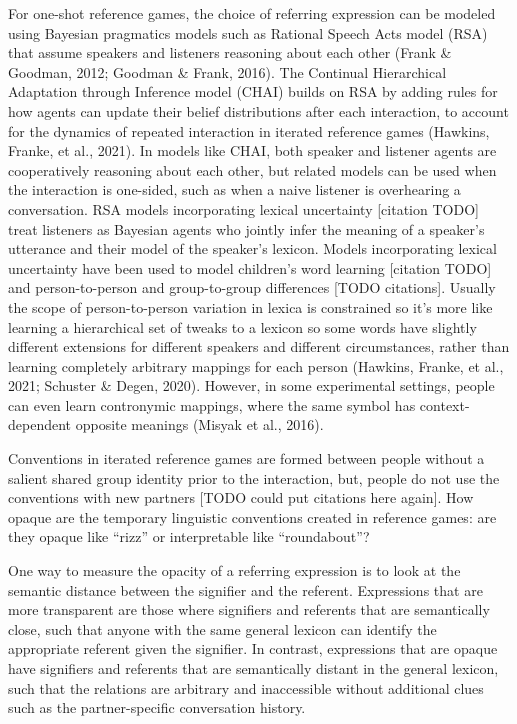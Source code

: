 \documentclass[10pt, letterpaper]{article}
\begin{document}
For one-shot reference games, the choice of referring expression can be
modeled using Bayesian pragmatics models such as Rational Speech Acts
model (RSA) that assume speakers and listeners reasoning about each
other (Frank \& Goodman, 2012; Goodman \& Frank, 2016). The Continual
Hierarchical Adaptation through Inference model (CHAI) builds on RSA by
adding rules for how agents can update their belief distributions after
each interaction, to account for the dynamics of repeated interaction in
iterated reference games (Hawkins, Franke, et al., 2021). In models like
CHAI, both speaker and listener agents are cooperatively reasoning about
each other, but related models can be used when the interaction is
one-sided, such as when a naive listener is overhearing a conversation.
RSA models incorporating lexical uncertainty {[}citation TODO{]} treat
listeners as Bayesian agents who jointly infer the meaning of a
speaker's utterance and their model of the speaker's lexicon. Models
incorporating lexical uncertainty have been used to model children's
word learning {[}citation TODO{]} and person-to-person and
group-to-group differences {[}TODO citations{]}. Usually the scope of
person-to-person variation in lexica is constrained so it's more like
learning a hierarchical set of tweaks to a lexicon so some words have
slightly different extensions for different speakers and different
circumstances, rather than learning completely arbitrary mappings for
each person (Hawkins, Franke, et al., 2021; Schuster \& Degen, 2020).
However, in some experimental settings, people can even learn
contronymic mappings, where the same symbol has context-dependent
opposite meanings (Misyak et al., 2016).

Conventions in iterated reference games are formed between people
without a salient shared group identity prior to the interaction, but,
people do not use the conventions with new partners {[}TODO could put
citations here again{]}. How opaque are the temporary linguistic
conventions created in reference games: are they opaque like ``rizz'' or
interpretable like ``roundabout''?

One way to measure the opacity of a referring expression is to look at
the semantic distance between the signifier and the referent.
Expressions that are more transparent are those where signifiers and
referents that are semantically close, such that anyone with the same
general lexicon can identify the appropriate referent given the
signifier. In contrast, expressions that are opaque have signifiers and
referents that are semantically distant in the general lexicon, such
that the relations are arbitrary and inaccessible without additional
clues such as the partner-specific conversation history.
\end{document}
